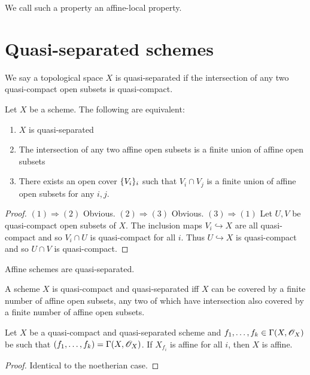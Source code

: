 \documentclass{memoir}
\begin{document}
\begin{definition}
    We call such a property an affine-local property.
\end{definition}
\section{Quasi-separated schemes}
\begin{definition}
    We say a topological space $X$ is quasi-separated if the intersection of any two quasi-compact open subsets is quasi-compact.
\end{definition}
\begin{thm}
    Let $X$ be a scheme.
    The following are equivalent:
    \begin{enumerate}
        \item $X$ is quasi-separated
        \item The intersection of any two affine open subsets is a finite union of affine open subsets
        \item There exists an open cover $\lbrace V_i\rbrace_i$ such that $V_i\cap V_j$ is a finite union of affine open subsets for any $i,j$.
    \end{enumerate}
\end{thm}
\begin{proof}
    $(1)\Rightarrow(2)$ Obvious. 
    $(2)\Rightarrow(3)$ Obvious.
    $(3)\Rightarrow(1)$ Let $U,V$ be quasi-compact open subsets of $X$.
    The inclusion maps $V_i\hookrightarrow X$ are all quasi-compact and so $V_i\cap U$ is quasi-compact for all $i$.
    Thus $U\hookrightarrow X$ is quasi-compact and so $U\cap V$ is quasi-compact.
\end{proof}
\begin{corollary}
    Affine schemes are quasi-separated.
\end{corollary}
\begin{corollary}
    A scheme $X$ is quasi-compact and quasi-separated iff $X$ can be covered by a finite number of affine open subsets, any two of which have intersection also covered by a finite number of affine open subsets.
\end{corollary}
\begin{proposition}
    \label{prop:aff_cover_aff}
    Let $X$ be a quasi-compact and quasi-separated scheme and $f_1,\dots,f_k\in\Gamma(X,\mathscr{O}_X)$ be such that $(f_1,\dots,f_k) = \Gamma(X,\mathscr{O}_X)$. 
    If $X_{f_i}$ is affine for all $i$, then $X$ is affine.
\end{proposition}
\begin{proof}
    Identical to the noetherian case.
\end{proof}
\end{document}

